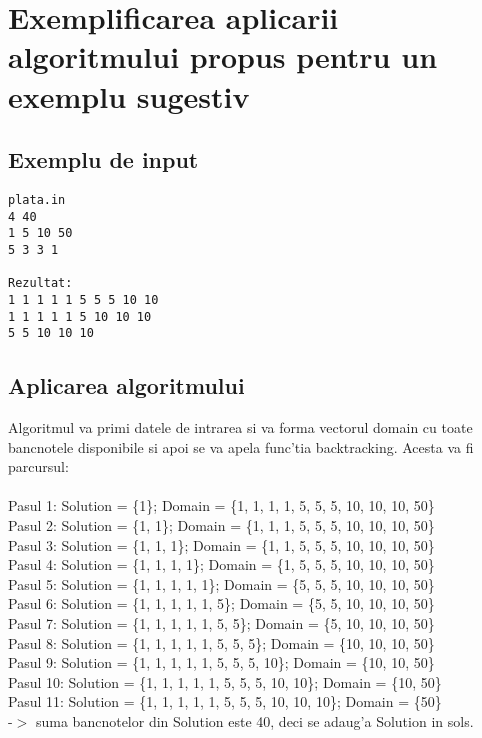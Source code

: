 \section{Exemplificarea aplicarii algoritmului propus pentru un exemplu sugestiv}
\subsection{Exemplu de input}
\begin{verbatim}
plata.in
4 40
1 5 10 50
5 3 3 1

Rezultat:
1 1 1 1 1 5 5 5 10 10
1 1 1 1 1 5 10 10 10
5 5 10 10 10
\end{verbatim}
\subsection{Aplicarea algoritmului}

Algoritmul va primi datele de intrarea si va forma vectorul domain cu toate bancnotele disponibile si apoi se va apela func'tia backtracking. Acesta va fi parcursul:\\\\
\myindent
Pasul 1:   Solution = \{1\}; Domain = \{1, 1, 1, 1, 5, 5, 5, 10, 10, 10, 50\}\\
\myindent
Pasul 2:   Solution = \{1, 1\}; Domain = \{1, 1, 1, 5, 5, 5, 10, 10, 10, 50\}\\
\myindent
Pasul 3:   Solution = \{1, 1, 1\}; Domain = \{1, 1, 5, 5, 5, 10, 10, 10, 50\}\\
\myindent
Pasul 4:   Solution = \{1, 1, 1, 1\}; Domain = \{1, 5, 5, 5, 10, 10, 10, 50\}\\
\myindent
Pasul 5:   Solution = \{1, 1, 1, 1, 1\}; Domain = \{5, 5, 5, 10, 10, 10, 50\}\\
\myindent
Pasul 6:   Solution = \{1, 1, 1, 1, 1, 5\}; Domain = \{5, 5, 10, 10, 10, 50\}\\
\myindent
Pasul 7:   Solution = \{1, 1, 1, 1, 1, 5, 5\}; Domain = \{5, 10, 10, 10, 50\}\\
\myindent
Pasul 8:   Solution = \{1, 1, 1, 1, 1, 5, 5, 5\}; Domain = \{10, 10, 10, 50\}\\
\myindent
Pasul 9:   Solution = \{1, 1, 1, 1, 1, 5, 5, 5, 10\}; Domain = \{10, 10, 50\}\\
\myindent
Pasul 10: Solution = \{1, 1, 1, 1, 1, 5, 5, 5, 10, 10\}; Domain = \{10, 50\}\\
\myindent
Pasul 11: Solution = \{1, 1, 1, 1, 1, 5, 5, 5, 10, 10, 10\}; Domain = \{50\}\\
\myindent
-$>$ suma bancnotelor din Solution este 40, deci se adaug'a Solution in sols.\\

